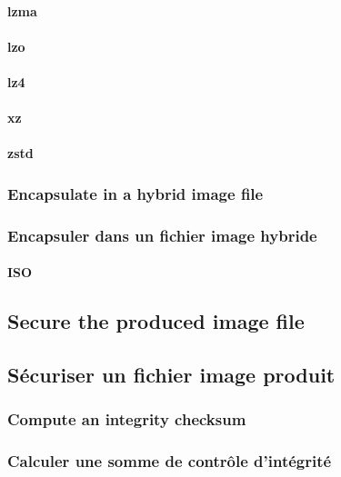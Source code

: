 \paragraph{lzma}

\paragraph{lzo}

\paragraph{lz4}

\paragraph{xz}

\paragraph{zstd}

\ml
{\subsubsection{Encapsulate in a hybrid image file}}
{\subsubsection{Encapsuler dans un fichier image hybride}}

\paragraph{ISO}

\ml
{\subsection{Secure the produced image file}}
{\subsection{Sécuriser un fichier image produit}}

\ml
{\subsubsection{Compute an integrity checksum}}
{\subsubsection{Calculer une somme de contrôle d’intégrité}}

